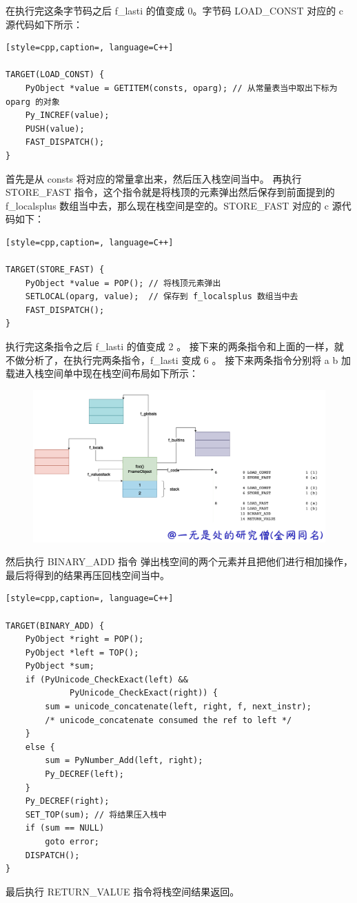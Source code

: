 在执行完这条字节码之后 f\_lasti 的值变成 0。字节码 LOAD\_CONST 对应的 c 源代码如下所示：
\begin{lstlisting}[style=cpp,caption=, language=C++]

TARGET(LOAD_CONST) {
    PyObject *value = GETITEM(consts, oparg); // 从常量表当中取出下标为 oparg 的对象
    Py_INCREF(value);
    PUSH(value);
    FAST_DISPATCH();
}
\end{lstlisting}
首先是从 consts 将对应的常量拿出来，然后压入栈空间当中。
再执行 STORE\_FAST 指令，这个指令就是将栈顶的元素弹出然后保存到前面提到的 f\_localsplus 数组当中去，那么现在栈空间是空的。STORE\_FAST 对应的 c 源代码如下：
\begin{lstlisting}[style=cpp,caption=, language=C++]

TARGET(STORE_FAST) {
    PyObject *value = POP(); // 将栈顶元素弹出
    SETLOCAL(oparg, value);  // 保存到 f_localsplus 数组当中去
    FAST_DISPATCH();
}
\end{lstlisting}
执行完这条指令之后 f\_lasti 的值变成 2 。
接下来的两条指令和上面的一样，就不做分析了，在执行完两条指令，f\_lasti 变成 6 。
接下来两条指令分别将 a b 加载进入栈空间单中现在栈空间布局如下所示：

    \begin{figure}[H]
        \centering
            \includegraphics[scale=.25]{images/75-frame.png}
						\caption{ }
        \label{fig:my_label}
    \end{figure}
    
然后执行 BINARY\_ADD 指令 弹出栈空间的两个元素并且把他们进行相加操作，最后将得到的结果再压回栈空间当中。
\begin{lstlisting}[style=cpp,caption=, language=C++]

TARGET(BINARY_ADD) {
    PyObject *right = POP();
    PyObject *left = TOP();
    PyObject *sum;
    if (PyUnicode_CheckExact(left) &&
             PyUnicode_CheckExact(right)) {
        sum = unicode_concatenate(left, right, f, next_instr);
        /* unicode_concatenate consumed the ref to left */
    }
    else {
        sum = PyNumber_Add(left, right);
        Py_DECREF(left);
    }
    Py_DECREF(right);
    SET_TOP(sum); // 将结果压入栈中
    if (sum == NULL)
        goto error;
    DISPATCH();
}
\end{lstlisting}
最后执行 RETURN\_VALUE 指令将栈空间结果返回。
